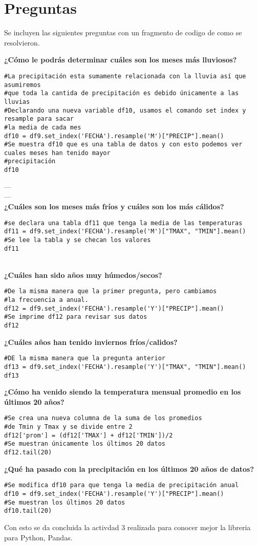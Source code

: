 \documentclass[notitlepage]{report}
\begin{document}
\section*{Preguntas}
Se incluyen las siguientes preguntas con un fragmento de codigo de como se resolvieron. 

{\bfseries ¿Cómo le podrás determinar cuáles son los meses más lluviosos?}
\begin{verbatim} 
#La precipitación esta sumamente relacionada con la lluvia así que asumiremos
#que toda la cantida de precipitación es debido únicamente a las lluvias
#Declarando una nueva variable df10, usamos el comando set index y resample para sacar 
#la media de cada mes 
df10 = df9.set_index('FECHA').resample('M')["PRECIP"].mean()
#Se muestra df10 que es una tabla de datos y con esto podemos ver cuales meses han tenido mayor 
#precipitación 
df10

\end{verbatim}
--- \\
--- \\
{\bfseries ¿Cuáles son los meses más fríos y cuáles son los más cálidos?}
\begin{verbatim}
#se declara una tabla df11 que tenga la media de las temperaturas
df11 = df9.set_index('FECHA').resample('M')["TMAX", "TMIN"].mean()
#Se lee la tabla y se checan los valores
df11
\end{verbatim}
\\
{\bfseries ¿Cuáles han sido años muy húmedos/secos?}
\begin{verbatim}
#De la misma manera que la primer pregunta, pero cambiamos
#la frecuencia a anual. 
df12 = df9.set_index('FECHA').resample('Y')["PRECIP"].mean()
#Se imprime df12 para revisar sus datos
df12
\end{verbatim}
{\bfseries ¿Cuáles años han tenido inviernos fríos/calidos?}
\begin{verbatim}
#DE la misma manera que la pregunta anterior
df13 = df9.set_index('FECHA').resample('Y')["TMAX", "TMIN"].mean()
df13
\end{verbatim}
{\bfseries ¿Cómo ha venido siendo la temperatura mensual promedio en los últimos 20 años?}
\begin{verbatim}
#Se crea una nueva columna de la suma de los promedios
#de Tmin y Tmax y se divide entre 2 
df12['prom'] = (df12['TMAX'] + df12['TMIN'])/2
#Se muestran únicamente los últimos 20 datos
df12.tail(20)
\end{verbatim}
{\bfseries ¿Qué ha pasado con la precipitación en los últimos 20 años de datos?}
\begin{verbatim}
#Se modifica df10 para que tenga la media de precipitación anual
df10 = df9.set_index('FECHA').resample('Y')["PRECIP"].mean()
#Se muestran los últimos 20 datos
df10.tail(20)
\end{verbatim}

Con esto se da concluida la activdad 3 realizada para conocer mejor la libreria para Python, Pandas.
\end{document}
